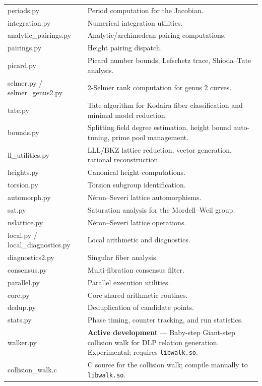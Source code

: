\documentclass[11pt, a4paper]{article}
\begin{document}
\begin{table}[h]
\begin{tabularx}{\textwidth}{>{\ttfamily}p{} X}
        periods.py & Period computation for the Jacobian. \\
        integration.py & Numerical integration utilities. \\
        analytic\_pairings.py & Analytic/archimedean pairing computations. \\
        pairings.py & Height pairing dispatch. \\
        picard.py & Picard number bounds, Lefschetz trace, Shioda--Tate analysis. \\
        selmer.py / selmer\_genus2.py & 2-Selmer rank computation for genus 2 curves. \\
        tate.py & Tate algorithm for Kodaira fiber classification and minimal model reduction. \\
        bounds.py & Splitting field degree estimation, height bound auto-tuning, prime pool management. \\
        ll\_utilities.py & LLL/BKZ lattice reduction, vector generation, rational reconstruction. \\
        heights.py & Canonical height computations. \\
        torsion.py & Torsion subgroup identification. \\
        automorph.py & N\'eron--Severi lattice automorphisms. \\
        sat.py & Saturation analysis for the Mordell--Weil group. \\
        nslattice.py & N\'eron--Severi lattice operations. \\
        local.py / local\_diagnostics.py & Local arithmetic and diagnostics. \\
        diagnostics2.py & Singular fiber analysis. \\
        consensus.py & Multi-fibration consensus filter. \\
        parallel.py & Parallel execution utilities. \\
        core.py & Core shared arithmetic routines. \\
        dedup.py & Deduplication of candidate points. \\
        stats.py & Phase timing, counter tracking, and run statistics. \\
        walker.py & \textbf{Active development} --- Baby-step Giant-step collision walk for DLP relation generation. Experimental; requires \texttt{libwalk.so}. \\
        collision\_walk.c & C source for the collision walk; compile manually to \texttt{libwalk.so}. \\
        \bottomrule
    \end{tabularx}
\end{table}
\end{document}
